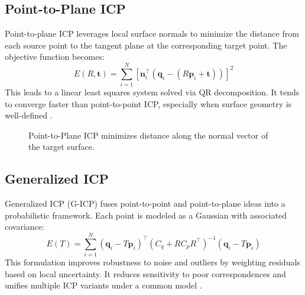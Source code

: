 \documentclass[11pt]{article}
\begin{document}
\subsection{Point-to-Plane ICP}
Point-to-plane ICP leverages local surface normals to minimize the distance from each source point to the tangent plane at the corresponding target point. The objective function becomes:
\[
E(R, \mathbf{t}) = \sum_{i=1}^N \left[ \mathbf{n}_i^\top (\mathbf{q}_i - (R\mathbf{p}_i + \mathbf{t})) \right]^2
\]
This leads to a linear least squares system solved via QR decomposition. It tends to converge faster than point-to-point ICP, especially when surface geometry is well-defined \citep{guevara2024scan}.

\begin{figure}[h]
\centering
{}
\caption{Point-to-Plane ICP minimizes distance along the normal vector of the target surface.}
\label{fig:ptpl_icp}
\end{figure}  

\subsection{Generalized ICP}
Generalized ICP (G-ICP) fuses point-to-point and point-to-plane ideas into a probabilistic framework. Each point is modeled as a Gaussian with associated covariance:
\[
E(T) = \sum_{i=1}^N (\mathbf{q}_i - T\mathbf{p}_i)^\top (C_q + R C_p R^\top)^{-1} (\mathbf{q}_i - T\mathbf{p}_i)
\]
This formulation improves robustness to noise and outliers by weighting residuals based on local uncertainty. It reduces sensitivity to poor correspondences and unifies multiple ICP variants under a common model \citep{segal2009gicp}.
\end{document}
